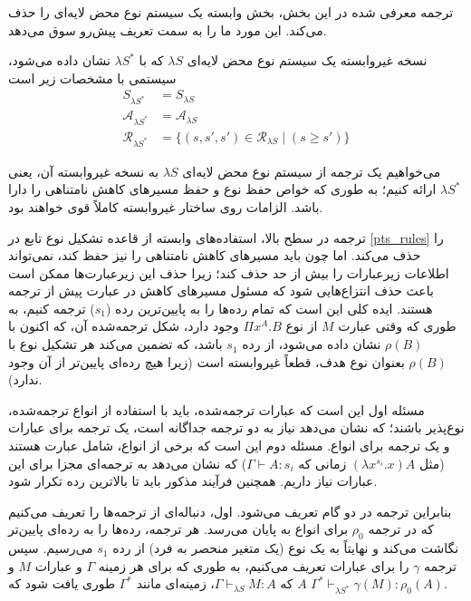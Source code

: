 ترجمه معرفی شده در این بخش، بخش وابسته یک سیستم نوع محض لایه‌ای را حذف می‌کند. این مورد ما را به سمت تعریف پیش‌رو سوق می‌دهد.

\begin{defn}
نسخه غیروابسته یک سیستم نوع محض لایه‌ای
$\lambda S$
که با
$\lambda S^*$
نشان داده می‌شود، سیستمی با مشخصات زیر است
\begin{align*}
S_{\lambda S^*} &= S_{\lambda S}\\
\mathcal{A}_{\lambda S^*} &= \mathcal{A}_{\lambda S}\\
\mathcal{R}_{\lambda S^*} &= \{(s,s',s') \in \mathcal{R}_{\lambda S} \mid (s \ge s')\}
\end{align*}
\end{defn}

می‌خواهیم یک ترجمه از سیستم نوع محض لایه‌ای
$\lambda S$
به نسخه غیروابسته آن، یعنی
$\lambda S^*$
ارائه کنیم؛ به طوری که خواص حفظ نوع و حفظ مسیرهای کاهش نامتناهی را دارا باشد. الزامات روی ساختار غیروابسته کاملاً قوی خواهند بود.

ترجمه در سطح بالا، استفاده‌های وابسته از قاعده تشکیل نوع تابع در 
\ref{pts_rules}
را حذف می‌کند. اما چون باید مسیرهای کاهش نامتناهی را نیز حفظ کند، نمی‌تواند اطلاعات زیرعبارات را بیش از حد حذف کند؛ زیرا حذف این زیرعبارت‌ها ممکن است باعث حذف انتزاع‌هایی شود که مسئول مسیرهای کاهش در عبارت پیش از ترجمه هستند.
ایده کلی این است که تمام رده‌ها را به پایین‌ترین رده ($s_1$) ترجمه کنیم،
به طوری که وقتی عبارت
$M$
از نوع
$\Pi x^A.B$
وجود دارد،
شکل ترجمه‌شده آن، که اکنون با
$\rho(B)$
نشان داده می‌شود، از رده
$s_1$
باشد، که تضمین می‌کند هر تشکیل نوع با
$\rho(B)$
بعنوان نوع هدف، قطعاً غیروابسته است (زیرا هیچ رده‌ای پایین‌تر از آن وجود ندارد).

مسئله اول این است که عبارات ترجمه‌شده، باید با استفاده از انواع ترجمه‌شده، نوع‌پذیر باشند؛ که نشان می‌دهد نیاز به دو ترجمه جداگانه است، یک ترجمه برای عبارات و یک ترجمه برای انواع.
مسئله دوم این است که برخی از انواع، شامل عبارت هستند (مثل $(\lambda x^{s_i}.x)A$ زمانی که $\Gamma \vdash A:s_i$) که نشان می‌دهد به ترجمه‌ای مجزا برای این عبارات نیاز داریم.
همچنین فرآیند مذکور باید تا بالاترین رده تکرار شود.

بنابراین ترجمه در دو گام تعریف می‌شود. اول، دنباله‌ای از ترجمه‌ها را تعریف می‌کنیم که در ترجمه
$\rho_0$
برای انواع به پایان می‌رسد. هر ترجمه، رده‌ها را به رده‌ای پایین‌تر نگاشت می‌کند و نهایتاً به یک نوع
 (یک متغیر منحصر به‌ فرد)
از رده
$s_1$
می‌رسیم. سپس ترجمه
$\gamma$
را برای عبارات تعریف می‌کنیم، به طوری که برای هر زمینه
$\Gamma$
و عبارات
$M$ و $A$
که
$\Gamma \vdash_{\lambda S} M:A$،
زمینه‌ای مانند
$\Gamma^*$
طوری یافت شود که
$\Gamma^* \vdash_{\lambda S^*} \gamma(M) : \rho_0(A)$.

